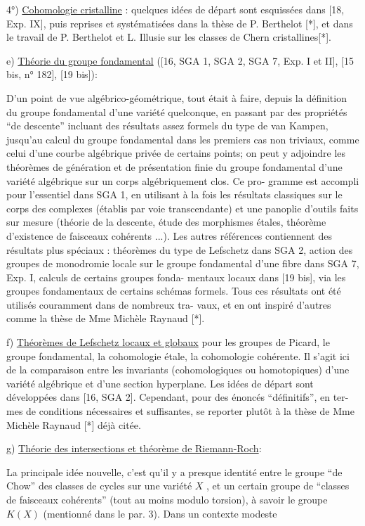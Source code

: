 
4°) \uline{Cohomologie cristalline} : quelques idées de départ sont esquissées
dans [18, Exp. IX], puis reprises et systématisées dans la thèse de P. Berthelot
[*], et dans le travail de P. Berthelot et L. Illusie sur les classes de Chern
cristallines[*].

e) \uline{Théorie du groupe fondamental} ([16, SGA 1, SGA 2, SGA 7, Exp. I et II],
[15 bis, n° 182], [19 bis]):

D'un point de vue algébrico-géométrique, tout était à faire, depuis
la définition du groupe fondamental d'une variété quelconque, en passant par
des propriétés ``de descente'' incluant des résultats assez formels du type de
van Kampen, jusqu'au calcul du groupe fondamental dans les premiers cas non
triviaux, comme celui d'une courbe algébrique privée de certains points; on
peut y adjoindre les théorèmes de génération et de présentation finie du groupe
fondamental d'une variété algébrique sur un corps algébriquement clos. Ce pro-%
gramme est accompli pour l'essentiel dans SGA 1, en utilisant à la fois les
résultats classiques sur le corps des complexes (établis par voie transcendante)
et une panoplie d'outils faits sur mesure (théorie de la descente, étude des
morphismes étales, théorème d'existence de faisceaux cohérents ...). Les
autres références contiennent des résultats plus spéciaux : théorèmes du type
de Lefschetz dans SGA 2, action des groupes de monodromie locale sur le groupe
fondamental d'une fibre dans SGA 7, Exp. I, calculs de certains groupes fonda-%
mentaux locaux dans [19 bis], via les groupes fondamentaux de certains schémas
formels. Tous ces résultats ont été utilisés couramment dans de nombreux tra-%
vaux, et en ont inspiré d'autres comme la thèse de Mme Michèle Raynaud [*].

f) \uline{Théorèmes de Lefschetz locaux et globaux} pour les groupes de Picard, le
groupe fondamental, la cohomologie étale, la cohomologie cohérente. Il s'agit
ici de la comparaison entre les invariants (cohomologiques ou homotopiques)
d'une variété algébrique et d'une section hyperplane. Les idées de départ sont
développées dans [16, SGA 2]. Cependant, pour des énoncés ``définitifs'', en ter-%
mes de conditions nécessaires et suffisantes, se reporter plutôt à la thèse
de Mme Michèle Raynaud [*] déjà citée.

g) \uline{Théorie des intersections et théorème de Riemann-Roch}:

La principale idée nouvelle, c'est qu'il y a presque identité entre
le groupe ``de Chow'' des classes de cycles sur une variété $X$ , et un certain
groupe de ``classes de faisceaux cohérents'' (tout au moins modulo torsion), à
savoir le groupe $K(X)$ (mentionné dans le par. 3). Dans un contexte modeste

